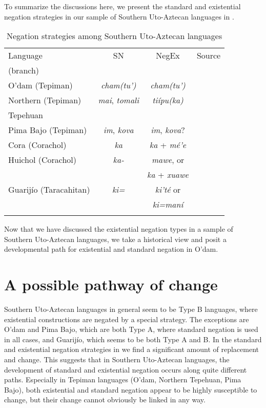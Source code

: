 \documentclass[output=paper]{langsci/langscibook}
\begin{document}
To summarize the discussions here, we present the standard and existential negation strategies in our sample of Southern Uto-Aztecan languages in . 
\begin{table}
\caption{Negation strategies among Southern Uto-Aztecan languages}
\label{tab:odam-snenstrat}
 \begin{tabularx}{\textwidth}{ l c c Q } 
  \lsptoprule
 Language & SN & NegEx & Source\\ 
 (branch) & & & \\
  \midrule
  O'dam (Tepiman)	&	\emph{cham(tu')}	&	\emph{cham(tu')} & \\
  \midrule
 Northern (Tepiman)	&	\emph{mai}, \emph{tomali}	&	\emph{tiípu(ka)} & \citep{bascom2003}\\
 Tepehuan   &   &   &\\
  \midrule
Pima Bajo (Tepiman)	&	\emph{im}, \emph{kova}	&	\emph{im}, \emph{kova}? & \citep{estrada2014}\\
  \midrule
 Cora (Corachol)	&	\emph{ka}	&	\emph{ka} + \emph{mé'e} & \citep{vazquez2013}\\
  \midrule
Huichol (Corachol)	&	\emph{ka-}	&	\emph{mawe}, or & \citep{bierge2017}\\
& & \emph{ka} + \emph{xuawe} & \\
  \midrule
 Guarijío (Taracahitan) &	\emph{ki=}	&	\emph{ki'té} or & \citep{armendariz2006}\\
  & & \emph{ki=maní} & \\
  \lspbottomrule
 \end{tabularx}
\end{table}
Now that we have discussed the existential negation types in a sample of
Southern Uto-Aztecan languages, we take a historical view and posit a
developmental path for existential and standard negation in O'dam.%

\section{A possible pathway of change}
\label{sec:odam-protoexneg}
Southern Uto-Aztecan languages in general seem to be Type B languages, where existential constructions are negated by a special strategy. The exceptions are O'dam and Pima Bajo, which are both Type A, where standard negation is used in all cases, and Guarijío, which seems to be both Type A and B. In the standard and existential negation strategies in  we find a significant amount of replacement and change. This suggests that in Southern Uto-Aztecan languages, the development of standard and existential negation occurs along quite different paths. Especially in Tepiman languages (O'dam, Northern Tepehuan, Pima Bajo), both existential and standard negation appear to be highly susceptible to change, but their change cannot obviously be linked in any way.
\end{document}
